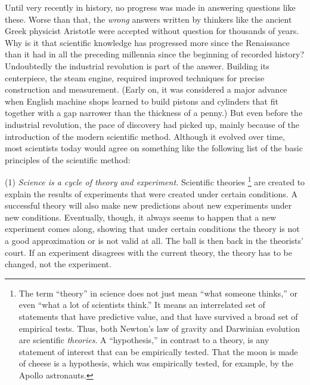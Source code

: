 Until very recently in history, no progress was made in
answering questions like these. Worse than that, the
\emph{wrong} answers written by thinkers like the ancient
Greek physicist Aristotle were accepted without question for
thousands of years. Why is it that scientific knowledge has
progressed more since the Renaissance
than it had in all the preceding millennia since the
beginning of recorded history? Undoubtedly the industrial
revolution is part of the answer. Building its centerpiece,
the steam engine, required improved techniques for precise
construction and measurement. (Early on, it was considered a
major advance when English machine shops learned to build
pistons and cylinders that fit together with a gap narrower
than the thickness of a penny.) But even before the
industrial revolution, the pace of discovery had picked up,
mainly because of the introduction of the modern scientific
method. Although it evolved over time, most scientists today
would agree on something like the following list of the
basic principles of the scientific method:



(1) \emph{Science is a cycle of theory and experiment.}
Scientific theories %
\footnote{The term ``theory'' in science does not just mean ``what someone thinks,'' or even ``what a lot of scientists think.'' It means
an interrelated set of statements that have predictive value, and that have survived a broad set of empirical tests. Thus, both Newton's law of gravity and
Darwinian evolution are scientific \emph{theories}. A ``hypothesis,'' in contrast to a theory, is any statement of interest that can be empirically tested.
That the moon is made of cheese is a hypothesis, which was empirically tested, for example, by the Apollo
astronauts.} %
are created to explain the results of
experiments that were created under certain conditions. A
successful theory will also make new predictions about new
experiments under new conditions. Eventually, though, it
always seems to happen that a new experiment comes along,
showing that under certain conditions the theory is not a
good approximation or is not valid at all. The ball is then
back in the theorists' court. If an experiment disagrees
with the current theory, the theory has to be changed, not the experiment.

